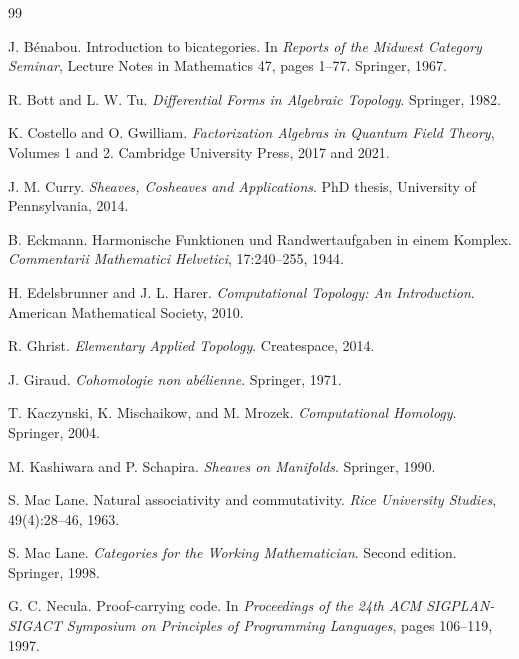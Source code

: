 \documentclass[11pt]{article}
\begin{document}
\begin{thebibliography}{99}

J. B\'enabou.
\newblock Introduction to bicategories.
\newblock In \emph{Reports of the Midwest Category Seminar}, Lecture Notes in Mathematics 47, pages 1--77. Springer, 1967.

R. Bott and L. W. Tu.
\newblock \emph{Differential Forms in Algebraic Topology}.
\newblock Springer, 1982.

K. Costello and O. Gwilliam.
\newblock \emph{Factorization Algebras in Quantum Field Theory}, Volumes 1 and 2.
\newblock Cambridge University Press, 2017 and 2021.

J. M. Curry.
\newblock \emph{Sheaves, Cosheaves and Applications}.
\newblock PhD thesis, University of Pennsylvania, 2014.

B. Eckmann.
\newblock Harmonische Funktionen und Randwertaufgaben in einem Komplex.
\newblock \emph{Commentarii Mathematici Helvetici}, 17:240--255, 1944.

H. Edelsbrunner and J. L. Harer.
\newblock \emph{Computational Topology: An Introduction}.
\newblock American Mathematical Society, 2010.

R. Ghrist.
\newblock \emph{Elementary Applied Topology}.
\newblock Createspace, 2014.

J. Giraud.
\newblock \emph{Cohomologie non ab\'elienne}.
\newblock Springer, 1971.

T. Kaczynski, K. Mischaikow, and M. Mrozek.
\newblock \emph{Computational Homology}.
\newblock Springer, 2004.

M. Kashiwara and P. Schapira.
\newblock \emph{Sheaves on Manifolds}.
\newblock Springer, 1990.

S. Mac Lane.
\newblock Natural associativity and commutativity.
\newblock \emph{Rice University Studies}, 49(4):28--46, 1963.

S. Mac Lane.
\newblock \emph{Categories for the Working Mathematician}.
\newblock Second edition. Springer, 1998.

G. C. Necula.
\newblock Proof-carrying code.
\newblock In \emph{Proceedings of the 24th ACM SIGPLAN-SIGACT Symposium on Principles of Programming Languages}, pages 106--119, 1997.


\end{thebibliography}
\end{document}
